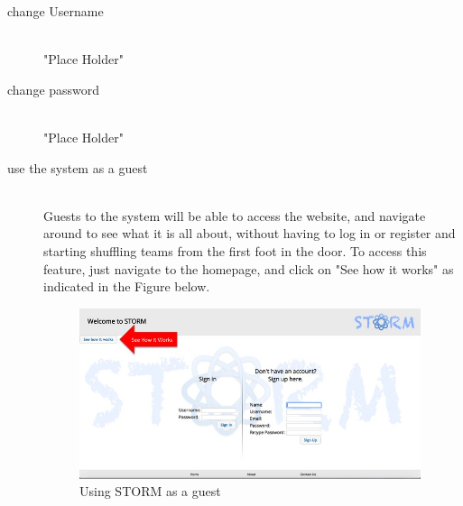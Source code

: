 \begin{description}
    	\item[change Username] \hfill \\
 		"Place Holder"
	\item[change password] \hfill \\
 		"Place Holder"
	\item[use the system as a guest] \hfill \\
 		Guests to the system will be able to access the website, and navigate around to see what it
		is all about, without having to log in or register and starting shuffling teams from the first foot in 		the door. To access this feature, just navigate to the homepage, and click on "See how it 			works" as indicated in the Figure below.\par
		\begin{figure}[h!] 
		\centering  
		\includegraphics[width=10cm]{./graphics/StormUMSU3.jpg}
		\caption{Using STORM as a guest}
		\end{figure}
				
\end{description}